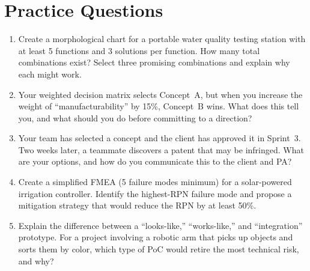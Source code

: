 \section{Practice Questions}
\begin{enumerate}[leftmargin=1.5em]
\item Create a morphological chart for a portable water quality testing station with at least 5 functions and 3 solutions per function. How many total combinations exist? Select three promising combinations and explain why each might work.
\item Your weighted decision matrix selects Concept~A, but when you increase the weight of ``manufacturability'' by 15\%, Concept~B wins. What does this tell you, and what should you do before committing to a direction?
\item Your team has selected a concept and the client has approved it in Sprint~3. Two weeks later, a teammate discovers a patent that may be infringed. What are your options, and how do you communicate this to the client and PA?
\item Create a simplified FMEA (5 failure modes minimum) for a solar-powered irrigation controller. Identify the highest-RPN failure mode and propose a mitigation strategy that would reduce the RPN by at least 50\%.
\item Explain the difference between a ``looks-like,'' ``works-like,'' and ``integration'' prototype. For a project involving a robotic arm that picks up objects and sorts them by color, which type of PoC would retire the most technical risk, and why?
\end{enumerate}

